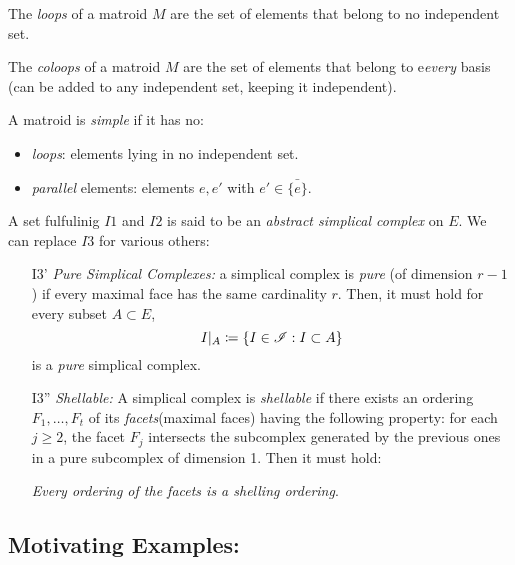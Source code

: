 \begin{definition}
    The \textit{loops} of a matroid $M$ are the set of elements that belong to no independent set.

    The \textit{coloops} of a matroid $M$ are the set of elements that belong to e\textit{every} basis (can be added to any independent set, keeping it independent).
\end{definition}

\begin{definition}
    A matroid is \textit{simple} if it has no:
    \begin{itemize}
        \item \textit{loops}: elements lying in no independent set.
        \item \textit{parallel} elements: elements $e, e'$ with $e' \in \bar{\{ e \}}$.
    \end{itemize}
\end{definition}

\begin{definition}
    A set fulfulinig $I1$ and $I2$ is said to be an \textit{abstract simplical complex} on $E$.
    We can replace $I3$ for various others:
    \begin{enumerate}
        \item[I3'] \textit{Pure Simplical Complexes:} a simplical complex is \textit{pure} (of dimension $r-1$) if every maximal face has the same cardinality $r$.
            Then, it must hold for every subset $A \subset E$,
            $$I|_A \coloneqq \{ I \in \mathscr{I} : I \subset A \}$$
            is a \textit{pure} simplical complex.
        \item[I3''] \textit{Shellable:} A simplical complex is \textit{shellable} if there exists an ordering $F_1, \dots, F_t$ of its \textit{facets}(maximal faces) having the following property: for each $j \geq 2$, the facet $F_j$ intersects the subcomplex generated by the previous ones in  a pure subcomplex of dimension 1.
            Then it must hold:

            \textit{Every ordering of the facets is a shelling ordering}.
    \end{enumerate}
\end{definition}

\subsection{Motivating Examples:}


